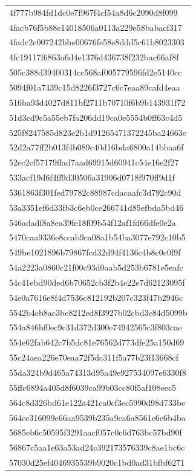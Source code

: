 \begin{tabular}{l}
4f777b984fd1dc0e7f967f4cf54a8d6c2090d8f099 \\
4facb76f5b88e14018506a0113a229e58babacf317 \\
4fadc2c007242bbe00676fe58e8ddd5c61b8023303 \\
4fc19117f6863a6d4e1376d436738f232bac66af8f \\
505c388d39400314cc568af005779596fd2e5140cc \\
5094f01a7439c15d8226f3727c6c7eaa89cafd4eaa \\
516ba93d4027d811bf2711b70710f6b9b143931f72 \\
51d3cd9c5a55eb7fa206dd19ca0e5554b0ff63c4d5 \\
525f8247585d823e2b1d91265471372245ba24663e \\
52d2a77ff2b013f4b089c40d16bda6800a14bbaa6f \\
52ec2cf57179ffad7aad69915d60941c54e16e2f27 \\
533acf19d6f4ff9d30506a31906d0718f970ff9d1f \\
5361863f301fed79782c88987cdacaafc3d792c90d \\
53a3351ef6d33fb3c6eb0ce266741d85efbda5bd46 \\
546adadf8a8ea39fe18f09b54f12af1fd66dfe0e2a \\
5470caa9336e8ccab9ca08a1b54ba3077e792c10b5 \\
549be1021896b79867fcd32d94f4136c4b8c0c0f9f \\
54a2223a0860c21f00c93d0aab5d253b6781e5eafc \\
54c41ebd90ded6b70652cb3f2b4e22e7d62123095f \\
54e0a7616e8f4d7536c812192b207c323f47b2946c \\
5542b4eb8ac3be8212ed8f3927b02cbd3c84d5099b \\
554a846bf0ec9c31d372d300e74942565c3f803cae \\
554e62fab642c7b5dc81e76562d773dfe25a150d69 \\
55c24aea226e70eaa72f5dc311f5a77b23f13668cf \\
55da324b9d465a74313d95a49e927534097e6330f8 \\
55ffc6894a405d8f6039ca99b03cc80f5af108eec5 \\
564c8d326bd61e122a421ca0cf3ec5990d98d733be \\
564cc316099e66aa9539b235a9ca6a8561e6c6b4ba \\
5685eb6c50595f3291aacf057c0c6d763bc57bd90f \\
56867c5aa1e63a53ad24c392173576339c8ae1bc6c \\
57030d25ef4046935539b9020c1bd0ad31bfbf6271 \\

\end{tabular}

